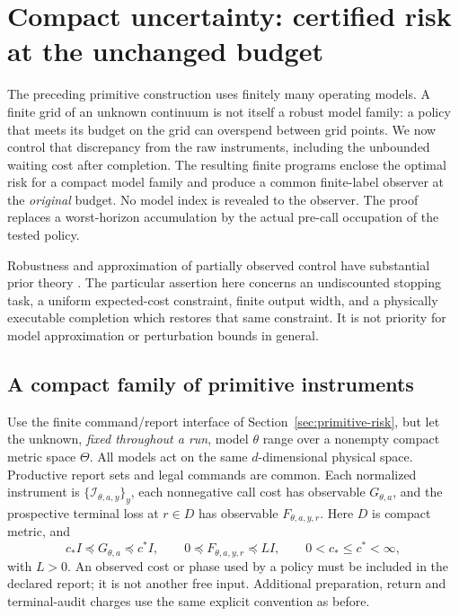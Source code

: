 \section{Compact uncertainty: certified risk at the unchanged budget}\label{sec:compact-risk}
The preceding primitive construction uses finitely many operating models. A finite grid of an unknown continuum is not itself a robust model family: a policy that meets its budget on the grid can overspend between grid points. We now control that discrepancy from the raw instruments, including the unbounded waiting cost after completion. The resulting finite programs enclose the optimal risk for a compact model family and produce a common finite-label observer at the \emph{original} budget. No model index is revealed to the observer. The proof replaces a worst-horizon accumulation by the actual pre-call occupation of the tested policy.

Robustness and approximation of partially observed control have substantial prior theory \cite{KaraYuksel20,Demirci25,Saldi25}. The particular assertion here concerns an undiscounted stopping task, a uniform expected-cost constraint, finite output width, and a physically executable completion which restores that same constraint. It is not priority for model approximation or perturbation bounds in general.

\subsection{A compact family of primitive instruments}
Use the finite command/report interface of Section~\ref{sec:primitive-risk}, but let the unknown, \emph{fixed throughout a run}, model $\theta$ range over a nonempty compact metric space $\Theta$. All models act on the same $d$-dimensional physical space. Productive report sets and legal commands are common. Each normalized instrument is $\{\mathcal I_{\theta,a,y}\}_y$, each nonnegative call cost has observable $G_{\theta,a}$, and the prospective terminal loss at $r\in D$ has observable $F_{\theta,a,y,r}$. Here $D$ is compact metric, and
\[
 c_*I\preccurlyeq G_{\theta,a}\preccurlyeq c^*I,\qquad
 0\preccurlyeq F_{\theta,a,y,r}\preccurlyeq LI,
 \qquad 0<c_*\le c^*<\infty,
\]
with $L>0$. An observed cost or phase used by a policy must be included in the declared report; it is not another free input. Additional preparation, return and terminal-audit charges use the same explicit convention as before.

